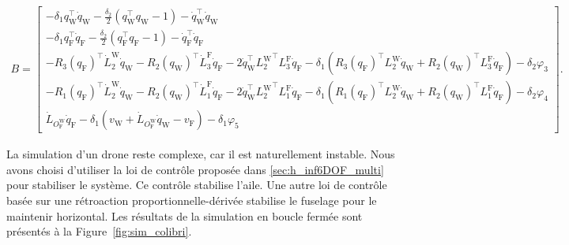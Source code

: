 \begin{align}
    \label{eq:b_contraint}
    B = \begin{bmatrix}
            -\delta_{1} q_{\text{W}}^\top \dot{q}_{\text{W}} - \frac{\delta_{2}}{2} (q_{\text{W}}^\top q_{\text{W}} -1) - \dot{q}_{\text{W}}^\top \dot{q}_{\text{W}} \\
            -\delta_{1} q_{\text{F}}^\top \dot{q}_{\text{F}} - \frac{\delta_{2}}{2} (q_{\text{F}}^\top q_{\text{F}} -1) - \dot{q}_{\text{F}}^\top \dot{q}_{\text{F}} \\
            -R_{3}(q_{\text{F}})^\top \dot{L}_{2}^{\text{W}}\dot{q}_{\text{W}} - R_{2}(q_{\text{W}})^\top \dot{L}_{3}^{\text{F}} \dot{q}_{\text{F}} - 2\dot{q}_{\text{W}}^\top {L_{2}^{\text{W}}}^\top L_{3}^{\text{F}} \dot{q}_{\text{F}} - \delta_{1}(R_{3}(q_{\text{F}})^\top L_{2}^{\text{W}}\dot{q}_{\text{W}} +  R_{2}(q_{\text{W}})^\top L_{3}^{\text{F}} \dot{q}_{\text{F}} ) - \delta_{2}\varphi_{3}\\
            -R_{1}(q_{\text{F}})^\top \dot{L}_{2}^{\text{W}}\dot{q}_{\text{W}} - R_{2}(q_{\text{W}})^\top \dot{L}_{1}^{\text{F}} \dot{q}_{\text{F}} - 2\dot{q}_{\text{W}}^\top {L_{2}^{\text{W}}}^\top L_{1}^{\text{F}} \dot{q}_{\text{F}} - \delta_{1}(R_{1}(q_{\text{F}})^\top L_{2}^{\text{W}}\dot{q}_{\text{W}} +  R_{2}(q_{\text{W}})^\top L_{1}^{\text{F}} \dot{q}_{\text{F}} ) - \delta_{2} \varphi_{4}\\
            \dot{L}_{O_{\text{F}}^{\text{W}}} \dot{q}_{\text{F}}  - \delta_{1}( v_{\text{W}} + \dot{L}_{O_{\text{F}}^{\text{W}}} \dot{q}_{\text{W}} - v_{\text{F}}) - \delta_{1}\varphi_{5}
        \end{bmatrix}.
\end{align}

La simulation d'un drone reste complexe, car il est naturellement instable. Nous avons choisi d'utiliser la loi de contrôle proposée dans \ref{sec:h_inf6DOF_multi} pour stabiliser le système. Ce contrôle stabilise l'aile. Une autre loi de contrôle basée sur une rétroaction proportionnelle-dérivée stabilise le fuselage pour le maintenir horizontal. Les résultats de la simulation en boucle fermée sont présentés à la Figure~\ref{fig:sim_colibri}.

